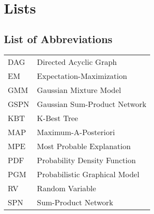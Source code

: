 \newcommand\listofthmlike[1][]{%
  \begingroup
  \setlisttheoremstyle{#1}%
  \def\contentsline##1{%
    \csname thmt@contentsline@##1\endcsname{##1}%
  }%
  \@for\thmt@envname:=\thmt@allenvs\do{%
    \thmtlo@newentry
  }%
  \let\thref@starttoc\@starttoc
  \def\@starttoc##1{\thref@starttoc{loe}}%
  \@fileswfalse
  \AtEndDocument{%
    \if@filesw
      \@ifundefined{tf@loe}{%
        \expandafter\newwrite\csname tf@loe\endcsname
        \immediate\openout \csname tf@loe\endcsname \jobname.loe\relax
      }{}%
    \fi
  }%
  \makeatletter
  \@starttoc{lof}
  \makeatother
  \endgroup
}

\chapter*{Lists}

\section*{List of Abbreviations}

\begin{tabular}{ll}
  DAG  & Directed Acyclic Graph        \\
  EM   & Expectation-Maximization      \\
  GMM  & Gaussian Mixture Model        \\
  GSPN & Gaussian Sum-Product Network  \\
  KBT  & K-Best Tree                   \\
  MAP  & Maximum-A-Posteriori          \\
  MPE  & Most Probable Explanation     \\
  PDF  & Probability Density Function  \\
  PGM  & Probabilistic Graphical Model \\
  RV   & Random Variable               \\
  SPN  & Sum-Product Network           \\
\end{tabular}

